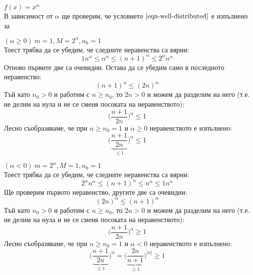 \begin{example}\label{exm-3-1}
	$f(x)=x^{\alpha}$\\\noindent
	В зависимост от $\alpha$ ще проверим, че условието $\ref{eqn-well-distributed}$ е изпълнено за
	\begin{mycase}
		\item $(\alpha\ge0)\ m=1,M=2^{\alpha},n_0=1$\\
		Тоест трябва да се убедим, че следните неравенства са вярни:
		\begin{equation*}
			1n^{\alpha}\le n^{\alpha}\le (n+1)^{\alpha}\le2^{\alpha}n^{\alpha}
		\end{equation*}
		Отново първите две са очевидни. Остава да се убедим само в последното неравенство:
		\begin{equation*}
			(n+1)^{\alpha}\le(2n)^{\alpha}
		\end{equation*}
		Тъй като $n_0>0$ и работим с $n\ge n_0$, то $2n>0$ и можем да разделим на него (т.е. не делим на нула и не се сменя посоката на неравенството):
		\begin{equation*}
			\bigg(\frac{n+1}{2n}\bigg)^{\alpha}\le1
		\end{equation*}
		Лесно съобразяваме, че при $n\ge n_0=1$ и $\alpha\ge0$ неравенството е изпълнено:
		\begin{equation*}
			\bigg(\underbrace{\frac{n+1}{2n}}_{\le1}\bigg)^{\alpha}\le1
		\end{equation*}
		
		\item $(\alpha<0)\ m=2^{\alpha},M=1,n_0=1$\\
		Тоест трябва да се убедим, че следните неравенства са вярни:
		\begin{equation*}
			2^{\alpha}n^{\alpha}\le (n+1)^{\alpha}\le n^{\alpha}\le1n^{\alpha}
		\end{equation*}
		Ще проверим първото неравенство, другите две са очевидни:
		\begin{equation*}
			(2n)^{\alpha}\le (n+1)^{\alpha}
		\end{equation*}
		Тъй като $n_0>0$ и работим с $n\ge n_0$, то $2n>0$ и можем да разделим на него (т.е. не делим на нула и не се сменя посоката на неравенството):
		\begin{equation*}
			\bigg(\frac{n+1}{2n}\bigg)^{\alpha}\ge1
		\end{equation*}
		Лесно съобразяваме, че при $n\ge n_0=1$ и $\alpha<0$ неравенството е изпълнено:
		\begin{equation*}
			\bigg(\underbrace{\frac{n+1}{2n}}_{\le1}\bigg)^{\alpha}=\bigg(\underbrace{\frac{2n}{n+1}}_{\ge1}\bigg)^{|\alpha|}\ge1
		\end{equation*}
	\end{mycase}
\end{example}\leavevmode\newline

